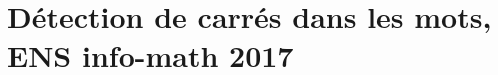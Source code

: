 
\usepackage{enumitem}
\def\numero{02+}
\def\classe{Option info MP1}

\camltrue

\chapter{Détection de carrés dans les mots,\\ ENS info-math 2017}

